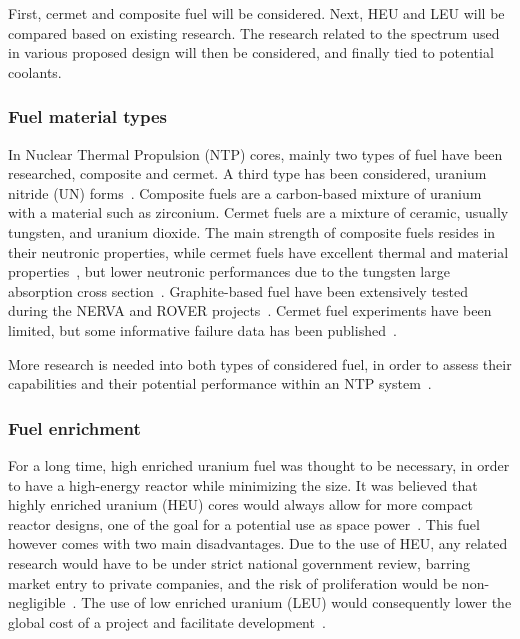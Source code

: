 \documentclass{article}
\begin{document}
First, cermet and composite fuel will be considered. Next, HEU and LEU will be compared based on existing research. The research related to the spectrum used in various proposed design will then be considered, and finally tied to potential coolants.

\subsubsection{Fuel material types}

In Nuclear Thermal Propulsion (NTP) cores, mainly two types of fuel have been researched, composite and cermet. A third type has been considered, uranium nitride (UN) forms~\cite{matthews1993fuels}. Composite fuels are a carbon-based mixture of uranium with a material such as zirconium. Cermet fuels are a mixture of ceramic, usually tungsten, and uranium dioxide. The main strength of composite fuels resides in their neutronic properties, while cermet fuels have excellent thermal and material properties~\cite{postoncermet}, but lower neutronic performances due to the tungsten large absorption cross section~\cite{venneridesign}. Graphite-based fuel have been extensively tested during the NERVA and ROVER projects~\cite{taub1975review,lyon1973performance}. Cermet fuel experiments have been limited, but some informative failure data has been published~\cite{stewart2013comparison}.

More research is needed into both types of considered fuel, in order to assess their capabilities and their potential performance within an NTP system~\cite{qualls2017steps}.

\subsubsection{Fuel enrichment}

For a long time, high enriched uranium fuel was thought to be necessary, in order to have a high-energy reactor while minimizing the size. It was believed that highly enriched uranium (HEU) cores would always allow for more compact reactor designs, one of the goal for a potential use as space power~\cite{patel2016comparing}. This fuel however comes with two main disadvantages. Due to the use of HEU, any related research would have to be under strict national government review, barring market entry to private companies, and the risk of proliferation would be non-negligible~\cite{venneri2015feasibility}. The use of low enriched uranium (LEU) would consequently lower the global cost of a project and facilitate development~\cite{houts2014safe}.
\end{document}
